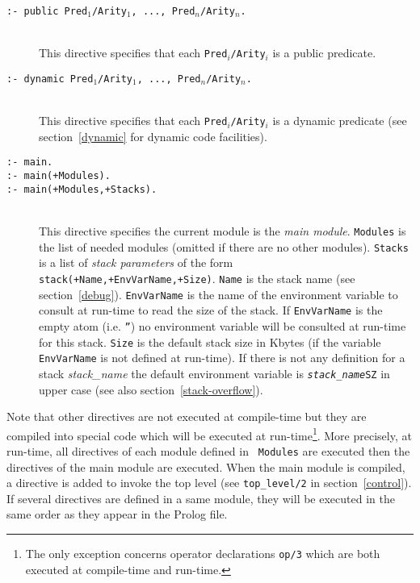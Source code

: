 \begin{description}

\item [{\tt :- public Pred$_1$/Arity$_1$, ..., Pred$_n$/Arity$_n$.}]~\\
	This directive specifies that each {\tt Pred$_i$/Arity$_i$} is
	a public predicate.

\item [{\tt :- dynamic Pred$_1$/Arity$_1$, ..., Pred$_n$/Arity$_n$.}]~\\
	This directive specifies that each {\tt Pred$_i$/Arity$_i$} is
	a dynamic predicate (see section~\ref{dynamic} for dynamic
	code facilities).

\item [{\tt :- main.}]
\item [{\tt :- main(+Modules).}]
\item [{\tt :- main(+Modules,+Stacks).}]~\\
	This directive specifies the current module is the {\em
	main module}. {\tt Modules} is the list of needed modules
	(omitted if there are no other modules). {\tt Stacks} is a
	list of {\em stack parameters} of the form {\tt
	stack(+Name,+EnvVarName,+Size)}. {\tt Name} is the stack
	name (see section~\ref{debug}). {\tt EnvVarName} is the name
	of the environment variable to consult at run-time to read the
	size of the stack. If {\tt EnvVarName} is the empty atom (i.e.
	{\tt ''}) no environment variable will be consulted at run-time
	for this stack. {\tt Size} is the default stack
	size in Kbytes (if the variable {\tt EnvVarName} is not
	defined at run-time). If there is not any definition for a
	stack {\em stack\_name} the default environment variable is 
	{\tt {\em stack\_name}SZ} in upper case (see also
	section~\ref{stack-overflow}). 

\end{description}

Note that other directives are not executed at compile-time but they
are compiled into special code which will be executed at
run-time\footnote{The only exception concerns operator declarations
{\tt op/3} which are both executed at compile-time and run-time.}. More
precisely, at run-time, all directives of each module defined in {\tt
Modules} are executed then the directives of the main module are
executed. When the main module is compiled, a directive is added to
invoke the top level (see {\tt top\_level/2} in section~\ref{control}).
If several directives are defined in a same module, they will be
executed in the same order as they appear in the Prolog file.\\

